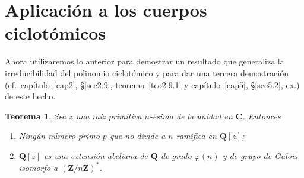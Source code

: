 \documentclass[oneside,bibtotoc,leqno,spanish]{amsbook}
\newcommand{\QQ}{\mathbf{Q}}
\newcommand{\ZZ}{\mathbf{Z}}
\newcommand{\CC}{\mathbf{C}}
\numberwithin{equation}{section}
\theoremstyle{defi}
\theoremstyle{note}
\newtheorem{theorem}{Teorema}
\theoremstyle{rem}
\numberwithin{theorem}{section}
\numberwithin{proposition}{section}
\numberwithin{definition}{section}
\numberwithin{lemma}{section}
\numberwithin{corollary}{section}
\numberwithin{example}{section}
\numberwithin{footnote}{section}%
\begin{document}
\section{Aplicaci\'on a los cuerpos ciclot\'omicos}\label{sec6.4}

Ahora utilizaremos lo anterior para demostrar un resultado que generaliza la irreducibilidad del polinomio ciclot\'omico
y para dar una tercera demostraci\'on (cf.~cap\'itulo~\ref{cap2}, \S\ref{sec2.9}, teorema~\ref{teo2.9.1}
y cap\'itulo~\ref{cap5}, \S\ref{sec5.2}, ex.) de este hecho.

\begin{theorem}\label{teo6.4.1}
Sea $z$ una ra\'iz primitiva $n$-\'esima de la unidad en $\CC$. Entonces
\begin{enumerate}
\item Ning\'un n\'umero primo $p$ que no divide a $n$ ramifica en $\QQ[z]$;
\item $\QQ[z]$ es una extensi\'on abeliana de $\QQ$ de grado $\varphi(n)$ y de grupo de Galois isomorfo
a $(\ZZ/n\ZZ)^{*}$.
\end{enumerate}
\end{theorem}
\end{document}
